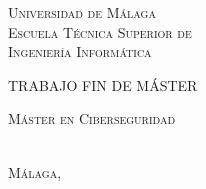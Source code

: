 
\thispagestyle{empty}


	\begin{center}
		\Large \scshape
		Universidad de Málaga\\
		\bigskip
		Escuela Técnica Superior de\\
		Ingeniería Informática
	\end{center}

	\bigskip


\bigskip

	\bigskip \bigskip \bigskip \bigskip

	\begin{center}
		\Large \scshape
		TRABAJO FIN DE MÁSTER
	\end{center}

	\bigskip \bigskip \bigskip \bigskip

	\begin{center}
		\huge \scshape
		\tfgtitlename %
	\end{center}

	\vfill

	\begin{center}
		\Large \scshape
		Máster en Ciberseguridad
	\end{center}

	\bigskip \bigskip \bigskip \bigskip


	\begin{flushright}
		\large \scshape
		\tfgauthorname \\%
		Málaga, \tfganno %
	\end{flushright}



\blankpage
